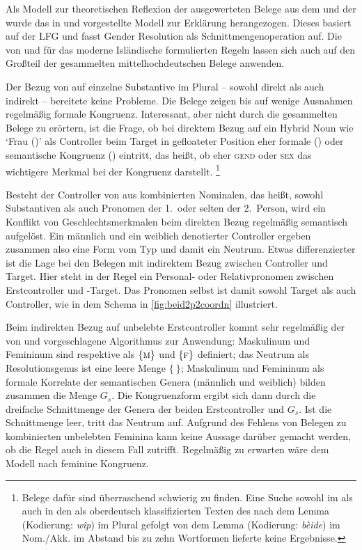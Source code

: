 Als Modell zur theoretischen Reflexion der ausgewerteten Belege aus dem
\CAO{} und der \KC{} wurde das in \citet{wechsler2009} und
\citet{wechslerzlatic2003} vorgestellte Modell zur Erklärung herangezogen.
Dieses basiert auf der LFG und fasst Gender Resolution als
Schnittmengenoperation auf. Die von \citet[578]{wechsler2009} und
\citet[186]{wechslerzlatic2003} für das moderne Isländische formulierten Regeln
lassen sich auch auf den Großteil der gesammelten mittelhochdeutschen Belege
anwenden.

Der Bezug von  auf einzelne Substantive im Plural -- sowohl direkt
als auch indirekt -- bereitete keine Probleme. Die Belege zeigen bis auf wenige
Ausnahmen regelmäßig formale Kongruenz. Interessant, aber nicht durch die
gesammelten Belege zu erörtern, ist die Frage, ob bei direktem Bezug auf ein
Hybrid Noun wie  `Frau (\NeutF)' als Controller beim Target in
gefloateter Position eher formale () oder semantische Kongruenz
() eintritt, das heißt, ob eher \textsc{gend} oder \textsc{sex} das
wichtigere Merkmal bei der Kongruenz darstellt.%
%
	\footnote{Belege dafür sind überraschend schwierig zu finden. Eine Suche
		sowohl im \CAO{} als auch in den als oberdeutsch klassifizierten Texten
		des \REM{} nach dem Lemma  (Kodierung: \emph{wîp}) im
		Plural gefolgt von dem Lemma  (Kodierung: \emph{bèide})
		im Nom./Akk. im Abstand bis zu zehn Wortformen lieferte keine
		Ergebnisse.}

Besteht der Controller von  aus kombinierten Nominalen, das heißt,
sowohl Substantiven als auch Pronomen der 1.\ oder selten der 2.\ Person, wird
ein Konflikt von Geschlechtsmerkmalen beim direkten Bezug regelmäßig semantisch
aufgelöst. Ein männlich und ein weiblich denotierter Controller ergeben
zusammen also eine Form vom Typ  und damit ein Neutrum. Etwas
differenzierter ist die Lage bei den Belegen mit indirektem Bezug zwischen
Controller und Target. Hier steht in der Regel ein Personal- oder
Relativpronomen zwischen Erstcontroller und -Target. Das Pronomen
selbst ist damit sowohl Target als auch Controller, wie in dem Schema in
\cref{fig:beid2p2coordn} illustriert.

Beim indirekten Bezug auf unbelebte Erstcontroller kommt sehr regelmäßig der
von \citet[577]{wechsler2009} und \citet[184]{wechslerzlatic2003}
vorgeschlagene Algorithmus zur Anwendung: Maskulinum und Femininum sind
respektive als $\{\textsc{m}\}$ und $\{\textsc{f}\}$ definiert; das Neutrum als
Resolutionsgenus ist eine leere Menge $\{\ \}$; Maskulinum und Femininum als
formale Korrelate der semantischen Genera (männlich und weiblich) bilden
zusammen die Menge $G_s$. Die Kongruenzform ergibt sich dann durch die
dreifache Schnittmenge der Genera der beiden Erstcontroller und $G_s$. Ist die
Schnittmenge leer, tritt das Neutrum auf. Aufgrund des Fehlens von Belegen zu
kombinierten unbelebten Feminina kann keine Aussage darüber gemacht werden, ob
die Regel auch in diesem Fall zutrifft. Regelmäßig zu erwarten wäre dem Modell
nach feminine Kongruenz.

